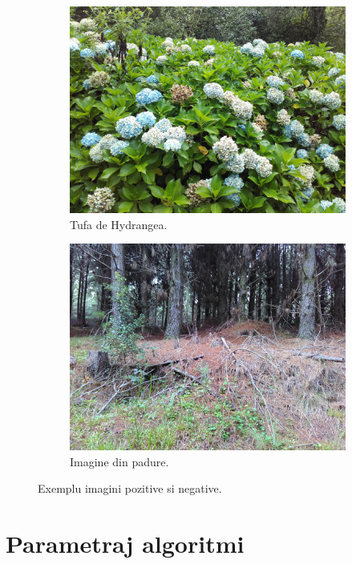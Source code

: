 \documentclass{article}
\begin{document}
\begin{figure}[h!]
  \centering
  \begin{subfigure}[b]{0.4\linewidth}
    \includegraphics[width=\linewidth]{pos.jpg}
    \caption{Tufa de Hydrangea.}
  \end{subfigure}
  \begin{subfigure}[b]{0.4\linewidth}
    \includegraphics[width=\linewidth]{neg.jpg}
    \caption{Imagine din padure.}
  \end{subfigure}
  \caption{Exemplu imagini pozitive si negative.}
  \label{fig:posneg}
\end{figure}


\section{Parametraj algoritmi}
\end{document}
